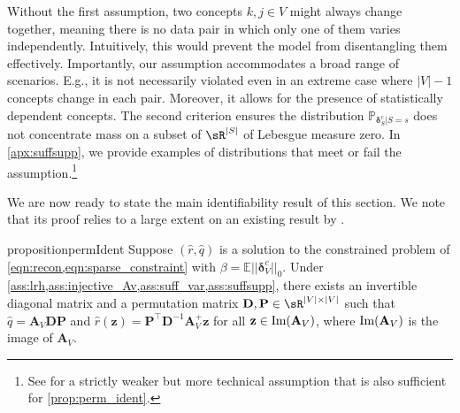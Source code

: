 \documentclass{article}
\newtheorem{definition}[theorem]{Definition}    %
\newcommand{\z}{\mathbf{z}}
\newcommand{\A}{\mathbf{A}}
\newcommand{\deltaBold}{\boldsymbol{\delta}}
\newcommand{\deltac}{\deltaBold^c}
\newcommand{\hatdeltac}{\hat{\deltaBold}^c}
\newcommand{\sj}[1]{\textcolor{violet}{\textbf{sj:} #1}}
\begin{document}
Without the first assumption, two concepts $k,j\in V$ might always change together, meaning there is no data pair in which only one of them varies independently. Intuitively, this would prevent the model from disentangling them effectively. Importantly, our assumption accommodates a broad range of scenarios. E.g., it is not necessarily violated even in an extreme case where $|V| - 1$ concepts change in each pair. Moreover, it allows for the presence of statistically dependent concepts.
The second criterion ensures the distribution $\mathbb{P}_{\deltac_S | S = s}$ does not concentrate mass on a subset of $\sR^{|S|}$ of Lebesgue measure zero. In \cref{apx:suffsupp}, we provide examples of distributions that meet or fail the assumption.\footnote{See \citet{lachapelle2023synergies} for a strictly weaker but more technical assumption that is also sufficient for \cref{prop:perm_ident}.} %



We are now ready to state the main identifiability result of this section. We note that its proof relies to a large extent on an existing result by \citet{lachapelle2023synergies}.

\begin{restatable}{proposition}{permIdent}\label{prop:perm_ident}
    Suppose $(\hat r, \hat q)$ is a solution to the constrained problem of \cref{eqn:recon,eqn:sparse_constraint} with $\beta = \mathbb{E}||\deltac_V||_0$. Under \cref{ass:lrh,ass:injective_Av,ass:suff_var,ass:suffsupp}, there  exists an invertible diagonal matrix and a permutation matrix $\mathbf{D}, \mathbf{P} \in \sR^{|V|\times|V|}$ such that $\hat q = \A_V \mathbf{D}\mathbf{P}$ and $\hat{r}(\z) = \mathbf{P}^\top\mathbf{D}^{-1}\A_V^+\z$ for all $\z \in \textnormal{Im}(\A_V)$, where $\textnormal{Im}(\A_V)$ is the image of $\A_V$.
\end{restatable}
\end{document}
